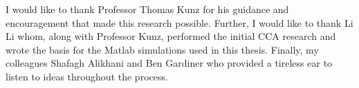 I would like to thank Professor Thomas Kunz for his guidance and encouragement that made this research possible.  Further, I would like to thank Li Li whom, along with Professor Kunz, performed the initial CCA research and wrote the basis for the Matlab simulations used in this thesis.  Finally, my colleagues Shafagh Alikhani and Ben Gardiner who provided a tireless ear to listen to ideas throughout the process.
